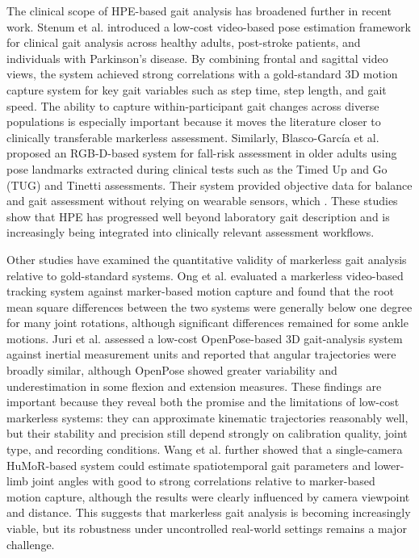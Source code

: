 \documentclass[12pt]{elsarticle}
\begin{document}
The clinical scope of HPE-based gait analysis has broadened further in recent work. Stenum et al. \cite{stenum2024clinical} introduced a low-cost video-based pose estimation framework for clinical gait analysis across healthy adults, post-stroke patients, and individuals with Parkinson’s disease. By combining frontal and sagittal video views, the system achieved strong correlations with a gold-standard 3D motion capture system for key gait variables such as step time, step length, and gait speed. The ability to capture within-participant gait changes across diverse populations is especially important because it moves the literature closer to clinically transferable markerless assessment. Similarly, Blasco-García et al. \cite{blasco2024computer} proposed an RGB-D-based system for fall-risk assessment in older adults using pose landmarks extracted during clinical tests such as the Timed Up and Go (TUG) and Tinetti assessments. Their system provided objective data for balance and gait assessment without relying on wearable sensors, which . These studies show that HPE has progressed well beyond laboratory gait description and is increasingly being integrated into clinically relevant assessment workflows.

Other studies have examined the quantitative validity of markerless gait analysis relative to gold-standard systems. Ong et al. \cite{ong2017efficacy} evaluated a markerless video-based tracking system against marker-based motion capture and found that the root mean square differences between the two systems were generally below one degree for many joint rotations, although significant differences remained for some ankle motions. Juri et al. \cite{juri2020characterization} assessed a low-cost OpenPose-based 3D gait-analysis system against inertial measurement units and reported that angular trajectories were broadly similar, although OpenPose showed greater variability and underestimation in some flexion and extension measures. These findings are important because they reveal both the promise and the limitations of low-cost markerless systems: they can approximate kinematic trajectories reasonably well, but their stability and precision still depend strongly on calibration quality, joint type, and recording conditions. Wang et al. \cite{wang2024markerless} further showed that a single-camera HuMoR-based system could estimate spatiotemporal gait parameters and lower-limb joint angles with good to strong correlations relative to marker-based motion capture, although the results were clearly influenced by camera viewpoint and distance. This suggests that markerless gait analysis is becoming increasingly viable, but its robustness under uncontrolled real-world settings remains a major challenge.
\end{document}
